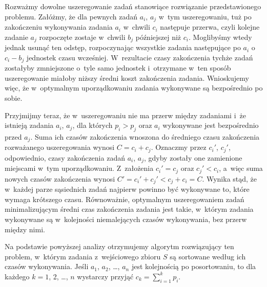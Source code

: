 
\subproblem %
Rozważmy dowolne uszeregowanie zadań stanowiące rozwiązanie przedstawionego problemu.
Załóżmy, że dla pewnych zadań $a_i$, $a_j$ w~tym uszeregowaniu, tuż po zakończeniu wykonywania zadania $a_i$ w~chwili $c_i$ następuje przerwa, czyli kolejne zadanie $a_j$ rozpoczęte zostaje w~chwili $b_j$ późniejszej niż $c_i$.
Moglibyśmy wtedy jednak usunąć ten odstęp, rozpoczynając wszystkie zadania następujące po $a_i$ o~$c_i-b_j$ jednostek czasu wcześniej.
W~rezultacie czasy zakończenia tychże zadań zostałyby zmniejszone o~tyle samo jednostek i~otrzymane w~ten sposób uszeregowanie miałoby niższy średni koszt zakończenia zadania.
Wnioskujemy więc, że w~optymalnym uporządkowaniu zadania wykonywane są bezpośrednio po sobie.

Przyjmijmy teraz, że w~uszeregowaniu nie ma przerw między zadaniami i~że istnieją zadania $a_i$, $a_j$, dla których $p_i>p_j$ oraz $a_i$ wykonywane jest bezpośrednio przed $a_j$.
Suma ich czasów zakończenia wnoszona do średniego czasu zakończenia rozważanego uszeregowania wynosi $C=c_i+c_j$.
Oznaczmy przez $c_i'$, $c_j'$, odpowiednio, czasy zakończenia zadań $a_i$, $a_j$, gdyby zostały one zamienione miejscami w~tym uporządkowaniu.
Z~założenia $c_i'=c_j$ oraz $c_j'<c_i$, a~więc suma nowych czasów zakończenia wynosi $C'=c_i'+c_j'<c_j+c_i=C$.
Wynika stąd, że w~każdej parze sąsiednich zadań najpierw powinno być wykonywane to, które wymaga krótszego czasu.
Równoważnie, optymalnym uszeregowaniem zadań minimalizującym średni czas zakończenia zadania jest takie, w~którym zadania wykonywane są w~kolejności niemalejących czasów wykonywania, bez przerw między nimi.

Na podstawie powyższej analizy otrzymujemy algorytm rozwiązujący ten problem, w~którym zadania z~wejściowego zbioru $S$ są sortowane według ich czasów wykonywania.
Jeśli $a_1$, $a_2$, \dots, $a_n$ jest kolejnością po posortowaniu, to dla każdego $k=1$, 2, \dots, $n$ wystarczy przyjąć $c_k=\sum_{i=1}^kp_i$.

\subproblem %
